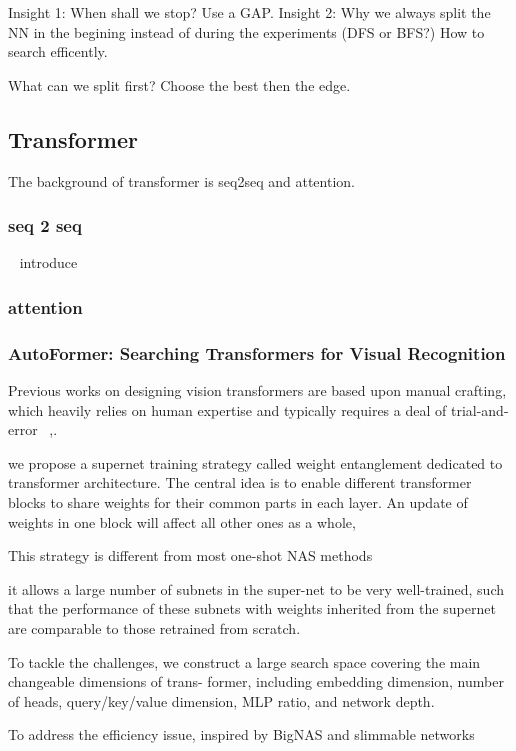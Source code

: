 \documentclass[UTF8]{article}
\begin{document}
Insight 1: When shall we stop? Use a GAP.
Insight 2: Why we always split the NN in the begining instead of during the experiments (DFS or BFS?) How to search efficently.

What can we split first? Choose the best then the edge.

\subsection{Transformer}

The background of transformer is seq2seq and attention.
\subsubsection{seq 2 seq}
~\cite{sutskever2014sequence} introduce 
\subsubsection{attention}

\subsubsection{AutoFormer: Searching Transformers for Visual Recognition}
Previous works on designing vision transformers are based upon manual crafting, which heavily relies on human expertise and typically requires a deal of trial-and- error ~\cite{yuan2021tokens, touvron2021training, dosovitskiy2020image},.

we propose a supernet training strategy called weight entanglement dedicated to transformer architecture. The central idea is to enable different transformer blocks to share weights for their common parts in each layer. An update of weights in one block will affect all other ones as a whole,

This strategy is different from most one-shot NAS methods \cite{guo2020single, chu2021fairnas, wu2019fbnet}

it allows a large number of subnets in the super-net to be very well-trained, such that the performance of these subnets with weights inherited from the supernet are comparable to those retrained from scratch.

To tackle the challenges, we construct a large search space covering the main changeable dimensions of trans- former, including embedding dimension, number of heads, query/key/value dimension, MLP ratio, and network depth.

To address the efficiency issue, inspired by BigNAS \cite{yu2020bignas} and slimmable networks \cite{yu2020bignas, yu2018slimmable}
\end{document}
